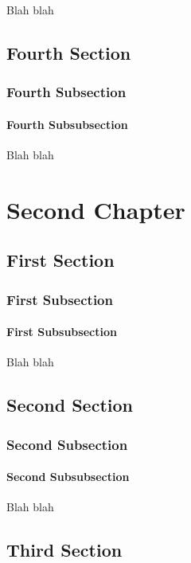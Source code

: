\documentclass[11pt]{book}
\begin{document}
Blah blah

\section{Fourth Section}

\subsection{Fourth Subsection}

\subsubsection{Fourth Subsubsection}

Blah blah

\chapter{Second Chapter}

\section{First Section}

\subsection{First Subsection}

\subsubsection{First Subsubsection}

Blah blah

\section{Second Section}

\subsection{Second Subsection}

\subsubsection{Second Subsubsection}

Blah blah

\section{Third Section}
\end{document}
